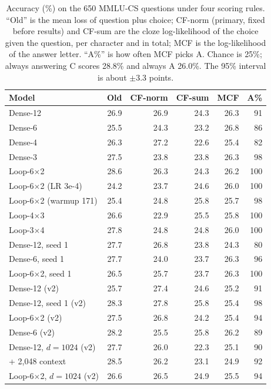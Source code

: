 \begin{table}[t]
\centering
\caption{Accuracy (\%) on the 650 MMLU-CS questions under four scoring rules. ``Old'' is the mean loss of question plus choice; CF-norm (primary, fixed before results) and CF-sum are the cloze log-likelihood of the choice given the question, per character and in total; MCF is the log-likelihood of the answer letter. ``A\%'' is how often MCF picks A. Chance is 25\%; always answering C scores 28.8\% and always A 26.0\%. The 95\% interval is about $\pm$3.3 points.}
\label{tab:mcq}
\setlength{\tabcolsep}{3.5pt}
\begin{tabular}{lrrrrr}
\toprule
Model & Old & CF-norm & CF-sum & MCF & A\% \\
\midrule
Dense-12 & 26.9 & 26.9 & 24.3 & 26.3 & 91 \\
Dense-6 & 25.5 & 24.3 & 23.2 & 26.8 & 86 \\
Dense-4 & 26.3 & 27.2 & 22.6 & 25.4 & 82 \\
Dense-3 & 27.5 & 23.8 & 23.8 & 26.3 & 98 \\
Loop-6$\times$2 & 28.6 & 26.3 & 24.3 & 26.2 & 100 \\
Loop-6$\times$2 (LR 3e-4) & 24.2 & 23.7 & 24.6 & 26.0 & 100 \\
Loop-6$\times$2 (warmup 171) & 25.4 & 24.8 & 25.8 & 25.7 & 98 \\
Loop-4$\times$3 & 26.6 & 22.9 & 25.5 & 25.8 & 100 \\
Loop-3$\times$4 & 27.8 & 24.8 & 24.8 & 26.0 & 100 \\
Dense-12, seed 1 & 27.7 & 26.8 & 23.8 & 24.3 & 80 \\
Dense-6, seed 1 & 27.7 & 24.0 & 23.7 & 26.3 & 96 \\
Loop-6$\times$2, seed 1 & 26.5 & 25.7 & 23.7 & 26.3 & 100 \\
Dense-12 (v2) & 25.7 & 27.4 & 24.6 & 25.2 & 91 \\
Dense-12, seed 1 (v2) & 28.3 & 27.8 & 25.8 & 25.4 & 98 \\
Loop-6$\times$2 (v2) & 27.5 & 26.8 & 24.2 & 25.4 & 94 \\
Dense-6 (v2) & 28.2 & 25.5 & 25.8 & 26.2 & 89 \\
Dense-12, $d{=}1024$ (v2) & 27.7 & 26.0 & 22.3 & 25.1 & 90 \\
\quad + 2,048 context & 28.5 & 26.2 & 23.1 & 24.9 & 92 \\
Loop-6$\times$2, $d{=}1024$ (v2) & 26.6 & 26.5 & 24.9 & 25.5 & 94 \\
\bottomrule
\end{tabular}
\end{table}
